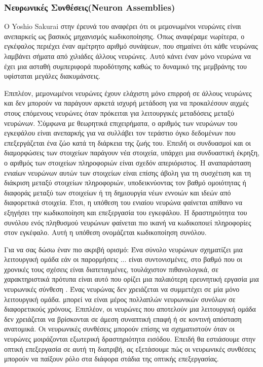 \documentclass[12pt]{report}
\begin{document}
\subsubsection{Νευρωνικές Συνθέσεις(\textlatin{Neuron Assemblies})}

Ο \textlatin{Yoshio Sakurai} στην έρευνά του \cite{sakurai1999} αναφέρει ότι οι μεμονωμένοι νευρώνες είναι ανεπαρκείς ως βασικός μηχανισμός κωδικοποίησης. Όπως αναφέραμε νωρίτερα, ο εγκέφαλος περιέχει έναν αμέτρητο αριθμό συνάψεων, που σημαίνει ότι κάθε νευρώνας λαμβάνει σήματα από χιλιάδες άλλους νευρώνες. Αυτό κάνει έναν μόνο νευρώνα να έχει μια ασταθή συμπεριφορά πυροδότησης καθώς το δυναμικό της μεμβράνης του υφίσταται μεγάλες διακυμάνσεις.

Επιπλέον, μεμονωμένοι νευρώνες έχουν ελάχιστη μόνο επιρροή σε άλλους νευρώνες και δεν μπορούν να παράγουν αρκετά ισχυρή μετάδοση για να προκαλέσουν αιχμές στους επόμενους νευρώνες όταν πρόκειται για λειτουργικές μεταδόσεις μεταξύ νευρώνων. Σύμφωνα με θεωρητικά επιχειρήματα, ο αριθμός των νευρώνων του εγκεφάλου είναι ανεπαρκής για να συλλάβει τον τεράστιο όγκο δεδομένων που επεξεργάζεται ένα ζώο κατά τη διάρκεια της ζωής του. Επειδή οι συνδυασμοί και οι διαμορφώσεις των στοιχείων παράγουν νέα στοιχεία, υπάρχει μια συνδυαστική έκρηξη, ο αριθμός των στοιχείων πληροφοριών είναι σχεδόν απεριόριστος. Η αναπαράσταση ενιαίων νευρώνων αυτών των στοιχείων είναι επίσης άβολη για τη συσχέτιση και τη διάκριση μεταξύ στοιχείων πληροφοριών, υποδεικνύοντας τον βαθμό ομοιότητας ή διαφοράς μεταξύ των στοιχείων ή τη δημιουργία νέων εννοιών και ιδεών από διαφορετικά στοιχεία. Έτσι, η υπόθεση του ενιαίου νευρώνα φαίνεται απίθανο να εξηγήσει την κωδικοποίηση και επεξεργασία του εγκεφάλου. Η δραστηριότητα του συνόλου ενός πληθυσμού νευρώνων φαίνεται πιο ικανή να κωδικοποιεί πληροφορίες στον εγκέφαλο. Αυτή η υπόθεση ονομάζεται κωδικοποίηση συνόλου.

Για να σας δώσω έναν πιο ακριβή ορισμό: Ένα σύνολο νευρώνων σχηματίζει μια λειτουργική ομάδα εάν οι παρορμήσεις ... είναι συντονισμένες, στο βαθμό που οι χρονικές τους σχέσεις είναι διατεταγμένες, τουλάχιστον πιθανολογικά, σε χαρακτηριστικά πρότυπα είναι αυτό που ορίζει μια παλαιότερη ερευνητική εργασία μια νευρωνικές σύνθεση \cite{gerstein1978}. Ένας νευρώνας δεν χρειάζεται να συμμετέχει σε μία μόνο λειτουργική ομάδα. μπορεί να είναι μέρος πολλαπλών νευρωνικών συνόλων σε διαφορετικούς χρόνους. Επιπλέον, οι νευρώνες που αποτελούν μια λειτουργική ομάδα δεν χρειάζεται να βρίσκονται σε άμεση συναπτική επαφή ή σε κοντινή απόσταση ανατομικά. Οι νευρωνικές συνθέσεις μπορούν επίσης να σχηματιστούν όταν οι νευρώνες μοιράζονται εξωτερική δραστηριότητα εισόδου. Επειδή θα εστιάσουμε στην οπτική επεξεργασία σε αυτή τη διατριβή, ας εξετάσουμε πώς οι νευρωνικές συνθέσεις μπορούν να παίξουν ρόλο στα διάφορα στάδια της οπτικής επεξεργασίας.
\end{document}

